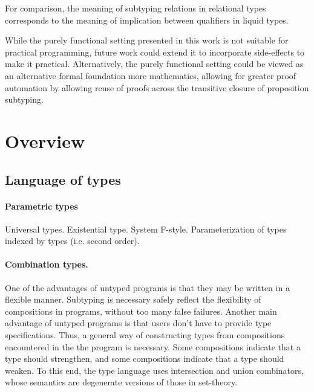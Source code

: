 \documentclass[acmsmall]{acmart}
\theoremstyle{definition}
\begin{document}
For comparison, the meaning of subtyping relations in relational types corresponds 
to the meaning of implication between qualifiers in liquid types.

While the purely functional setting presented in this work is not suitable for practical programming,
future work could extend it to incorporate side-effects to make it practical.
Alternatively, the purely functional setting could be viewed as an alternative formal foundation more
mathematics, allowing for greater proof automation by allowing reuse of proofs across the transitive closure of 
proposition subtyping.



\section{Overview}

\subsection{Language of types}

\paragraph{Parametric types}
Universal types. Existential type. System F-style. Parameterization of types indexed by types (i.e. second order).


\paragraph{Combination types.}
One of the advantages of untyped programs is that they may be written in a flexible manner.
Subtyping is necessary safely reflect the flexibility of compositions in programs, without too many false failures.
Another main advantage of untyped programs is that users don't have to provide type specifications.
Thus, a general way of constructing types from compositions encountered in the the program is necessary.
Some compositions indicate that a type should strengthen, and some compositions indicate that a type should weaken.
To this end, the type language uses intersection and union combinators, 
whose semantics are degenerate versions of those in set-theory.
\end{document}
